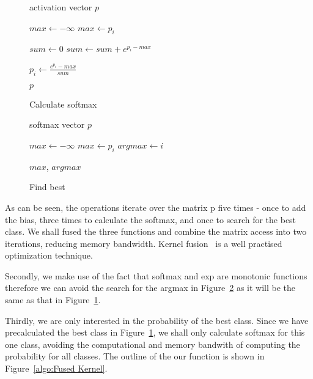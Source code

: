 \documentclass[11pt,a4paper]{article}
\begin{document}
\begin{figure} [h]
\begin{algorithmic}
\REQUIRE activation vector $p$


\STATE $max \gets - \infty$ 
    \STATE $max \gets p_i$
  \ENDIF
\ENDFOR 


\STATE $sum \gets 0$ 
  \STATE $sum \gets sum + e^{p_i - max}$
\ENDFOR 


  \STATE $p_i \gets \frac{e^{p_i} - max}{sum} $
\ENDFOR 

\RETURN $p$

\end{algorithmic}
\caption{Calculate softmax}
\label{algo:Calculate softmax}
\end{figure}

\begin{figure} [h]
\begin{algorithmic}
\REQUIRE softmax vector $p$

\STATE $max \gets - \infty$ 
    \STATE $max \gets p_i$
    \STATE $argmax \gets i$
  \ENDIF
\ENDFOR 

\RETURN $max$, $argmax$

\end{algorithmic}
\caption{Find best}
\label{algo:Find best}
\end{figure}


As can be seen, the operations iterate over the matrix p five times - once to add the bias, three times to calculate the softmax, and once to search for the best class. We shall fused the three functions and combine the matrix access into two iterations, reducing memory bandwidth. Kernel fusion~\citep{Guevara2009EnablingTP} is a well practised optimization technique.

Secondly, we make use of the fact that softmax and exp are monotonic functions therefore we can avoid the search for the argmax in Figure~\ref{algo:Find best} as it will be the same as that in Figure~\ref{algo:Calculate softmax}.

Thirdly, we are only interested in the probability of the best class. Since we have precalculated the best class in Figure~\ref{algo:Calculate softmax}, we shall only calculate softmax for this one class, avoiding the computational and memory bandwith of computing the probability for all classes. The outline of the our function is shown in Figure~\ref{algo:Fused Kernel}.
\end{document}
